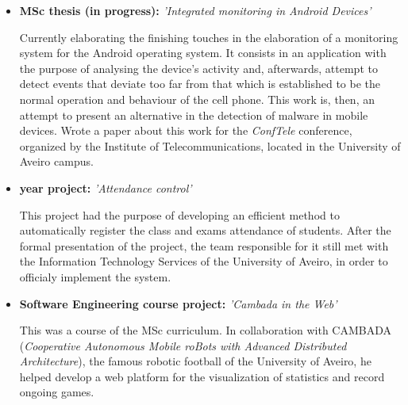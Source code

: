 \documentclass[11pt,a4paper,sans]{moderncv} %
\begin{document}
\vspace{5pt}

\begin{itemize}

\item{\textbf{MSc thesis (in progress): } \textit{'Integrated
      monitoring in Android Devices'}

\vspace{3pt}

\small{Currently elaborating the finishing touches in the elaboration of a
  monitoring system for the Android operating system. It consists in an
  application with the purpose of analysing the device's activity and,
  afterwards, attempt to detect events that deviate too far from that which is
  established to be the normal operation and behaviour of the cell phone. This
  work is, then, an attempt to present an alternative in the detection of
  malware in mobile devices. Wrote a paper about this work for the
  \textit{ConfTele} conference, organized by the Institute of
  Telecommunications, located in the University of Aveiro campus.}}

\item{\textbf{ year project: } \textit{'Attendance control'}

\vspace{3pt}

\small{This project had the purpose of developing an efficient method to
  automatically register the class and exams attendance of students. After the
  formal presentation of the project, the team responsible for it still met with
  the Information Technology Services of the University of Aveiro, in order to
  officialy implement the system.}}

\vspace{6pt}

\item{\textbf{Software Engineering course project: }\textit{'Cambada
      in the Web'}

\vspace{3pt}

\small{This was a course of the MSc curriculum. In collaboration with
  CAMBADA (\textit{Cooperative Autonomous Mobile roBots with Advanced
    Distributed Architecture}), the famous robotic football of the University of
  Aveiro, he helped develop a web platform for the visualization of statistics
  and record ongoing games.}}

\vspace{6pt}


\end{itemize}
\end{document}
